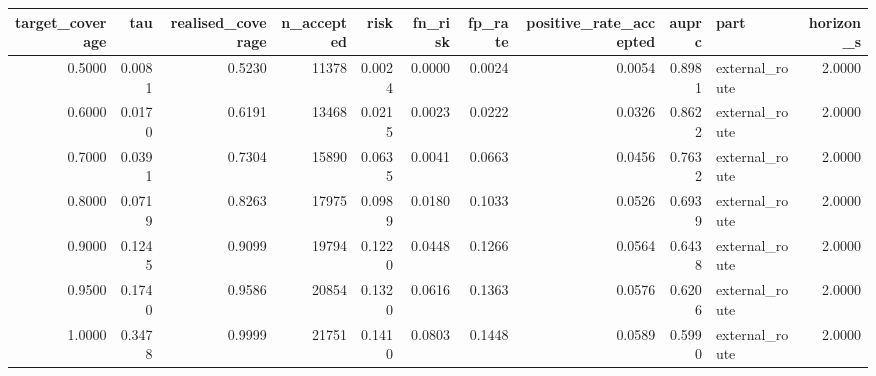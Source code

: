 \begin{tabular}{rrrrrrrrrlr}
\toprule
target\_coverage & tau & realised\_coverage & n\_accepted & risk & fn\_risk & fp\_rate & positive\_rate\_accepted & auprc & part & horizon\_s \\
\midrule
0.5000 & 0.0081 & 0.5230 & 11378 & 0.0024 & 0.0000 & 0.0024 & 0.0054 & 0.8981 & external\_route & 2.0000 \\
0.6000 & 0.0170 & 0.6191 & 13468 & 0.0215 & 0.0023 & 0.0222 & 0.0326 & 0.8622 & external\_route & 2.0000 \\
0.7000 & 0.0391 & 0.7304 & 15890 & 0.0635 & 0.0041 & 0.0663 & 0.0456 & 0.7632 & external\_route & 2.0000 \\
0.8000 & 0.0719 & 0.8263 & 17975 & 0.0989 & 0.0180 & 0.1033 & 0.0526 & 0.6939 & external\_route & 2.0000 \\
0.9000 & 0.1245 & 0.9099 & 19794 & 0.1220 & 0.0448 & 0.1266 & 0.0564 & 0.6438 & external\_route & 2.0000 \\
0.9500 & 0.1740 & 0.9586 & 20854 & 0.1320 & 0.0616 & 0.1363 & 0.0576 & 0.6206 & external\_route & 2.0000 \\
1.0000 & 0.3478 & 0.9999 & 21751 & 0.1410 & 0.0803 & 0.1448 & 0.0589 & 0.5990 & external\_route & 2.0000 \\
\bottomrule
\end{tabular}
